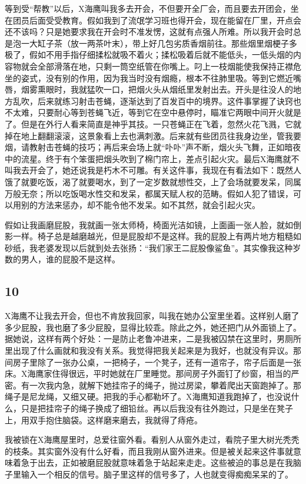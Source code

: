 等到受“帮教”以后，X海鹰叫我多去开会，不但要开全厂会，而且要去开团会，坐在团员后面受受教育。假如我到了流氓学习班也得开会，现在能留在厂里，开点会还不该吗？只是她要求我在开会时不准发愣，这就有点强人所难。所以我开会时总是泡一大缸子茶（放一两茶叶末），带上好几包劣质香烟前往。那些烟里烟梗子多极了，假如不用手指仔细揉松就吸不着火；揉松吸着后就不能低头，一低头烟的内容物就会全部滑落在地，只剩一筒空纸管在你嘴上。叼上一枝烟能使我保持正襟危坐的姿式，没有别的作用，因为我当时没有烟瘾，根本不往肺里吸。等到它燃近嘴唇，烟雾熏眼时，我就猛吹一口，把烟火头从烟纸里发射出去。开头是往没人的地方乱吹，后来就练习射击苍蝇，逐渐达到了百发百中的境界。这件事掌握了诀窍也不太难，只要耐心等到苍蝇飞近，等到它在空中悬停时，瞄准它两眼中间开火就是了。但是在外行人看来简直是神乎其技。一只苍蝇正在飞着，忽然火花飞溅，它就掉在地上翻翻滚滚，这景象看上去也满刺激。后来就有些团员往我身边坐，管我要烟，请教射击苍蝇的技巧；再后来会场上就“卟卟”声不断，烟火头飞舞，正如暗夜中的流星。终于有个笨蛋把烟头吹到了棉门帘上，差点引起火灾。最后X海鹰就不叫我去开会了，她还说我是朽木不可雕。有关这件事，我现在有看法如下：既然人饿了就要吃饭，渴了就要喝水，到了一定岁数就想性交，上了会场就要发呆，同属万般无奈；所以吃饭喝水性交和发呆，都属天赋人权的范畴。假如人犯了错误，可以用别的方法来惩办，却不能令他不发呆。如不其然，就会引起火灾。 

假如让我画磨屁股，我就画一张太师椅，椅面光洁如镜，上面画一张人脸，就如倒影一样。椅子总是越磨越光，但是屁股却不是这样。我的屁股上有两片地方粗糙如砂纸，我老婆发现以后就到处去张扬：“我们家王二屁股像鲨鱼”。其实像我这种岁数的男人，谁的屁股不是这样。 

\subsection{10} 

X海鹰不让我去开会，但也不肯放我回家，叫我在她办公室里坐着。这样别人磨了多少屁股，我也磨了多少屁股，显得比较乖。除此之外，她还把门从外面锁上了。据她说，这样有两个好处：一是防止老鲁冲进来，二是我被囚禁在这里时，男厕所里出现了什么画就和我没有关系。我觉得把我关起来是为我好，也就没有异议。那间房子里除了一张办公桌，一把椅子，一个凳子，还有一道帘子，帘子后面是一张床。X海鹰家住得很远，平时她就在厂里睡觉。那间房子外面钉了纱窗，相当的严密。有一次我内急，就解下她挂帘子的绳子，抛过房梁，攀着爬出天窗跑掉了。那绳子是尼龙绳，又细又硬。把我的手心都勒坏了。X海鹰知道我跑掉了，也没说什么，只是把挂帘子的绳子换成了细铅丝。再以后我没有往外跑过，只是坐在凳子上，用双手抱住脑袋。这样磨来磨去，我就得了痔疮。 

我被锁在X海鹰屋里时，总爱往窗外看。看别人从窗外走过，看院子里大树光秃秃的枝条。其实窗外没有什么好看，而且我刚从窗外进来。但是被关起来这件事就意味着急于出去，正如被磨屁股就意味着急于站起来走走。这些被迫的事总是在我脑子里输入一个相反的信号。脑子里这样的信号多了，人也就变得痴痴呆呆的了。

